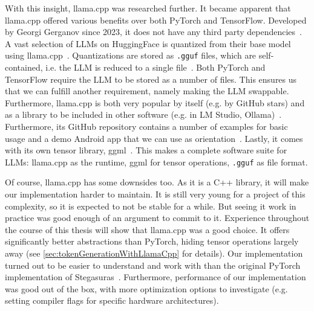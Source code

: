 With this insight, llama.cpp was researched further. It became apparent that llama.cpp offered various benefits over both PyTorch and TensorFlow. Developed by Georgi Gerganov since 2023, it does not have any third party dependencies~\cite{gerganovGgerganovLlamacpp2024}. A vast selection of \glspl{LLM} on HuggingFace is quantized from their base model using llama.cpp~\cite{huggingfaceModelsHuggingFace2025}. Quantizations are stored as \lstinline|.gguf| files, which are self-contained, i.e. the \gls{LLM} is reduced to a single file~\cite{huggingfaceGGUF}. Both PyTorch and TensorFlow require the \gls{LLM} to be stored as a number of files. This ensures us that we can fulfill another requirement, namely making the \gls{LLM} swappable. Furthermore, llama.cpp is both very popular by itself (e.g. by GitHub stars) and as a library to be included in other software (e.g. in LM Studio, Ollama)~\cite{gerganovGgerganovLlamacpp2024}. Furthermore, its GitHub repository contains a number of examples for basic usage and a demo Android app that we can use as orientation~\cite{gerganovGgerganovLlamacpp2024}. Lastly, it comes with its own tensor library, ggml~\cite{gerganovGgerganovGgml2024}. This makes a complete software suite for \glspl{LLM}: llama.cpp as the runtime, ggml for tensor operations, \lstinline|.gguf| as file format.

Of course, llama.cpp has some downsides too. As it is a C++ library, it will make our implementation harder to maintain. It is still very young for a project of this complexity, so it is expected to not be stable for a while. But seeing it work in practice was good enough of an argument to commit to it. Experience throughout the course of this thesis will show that llama.cpp was a good choice. It offers significantly better abstractions than PyTorch, hiding tensor operations largely away (see \cref{sec:tokenGenerationWithLlamaCpp} for details). Our implementation turned out to be easier to understand and work with than the original PyTorch implementation of Stegasuras~\cite{zieglerHarvardnlpNeuralSteganography2025}. Furthermore, performance of our implementation was good out of the box, with more optimization options to investigate (e.g. setting compiler flags for specific hardware architectures).

